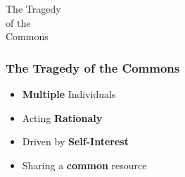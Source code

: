 \documentclass[18pt]{beamer}
\begin{document}
{
\begin{frame}[plain]
\end{frame}
}


{
\color{white}
\begin{frame}[plain]
\fontsize{36pt}{36pt}\selectfont
\center
\begin{center}
The Tragedy\\
of the\\
Commons\\
\end{center}
\end{frame}
}


\begin{frame}
\frametitle{The Tragedy of the Commons}
\Huge
\begin{itemize}
\item \textbf{Multiple} Individuals
\pause
\item Acting \textbf{Rationaly}
\pause
\item Driven by \textbf{Self-Interest}
\pause
\item Sharing a \textbf{common} resource
\end{itemize}
\end{frame}
\end{document}
